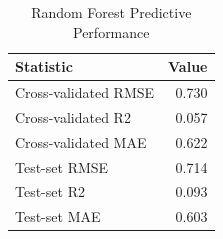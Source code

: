 \begin{table}[!h]
\centering
\caption{Random Forest Predictive Performance}
\centering
\begin{tabular}[t]{lr}
\toprule
Statistic & Value\\
\midrule
Cross-validated RMSE & 0.730\\
Cross-validated R2 & 0.057\\
Cross-validated MAE & 0.622\\
Test-set RMSE & 0.714\\
Test-set R2 & 0.093\\
\addlinespace
Test-set MAE & 0.603\\
\bottomrule
\end{tabular}
\end{table}
